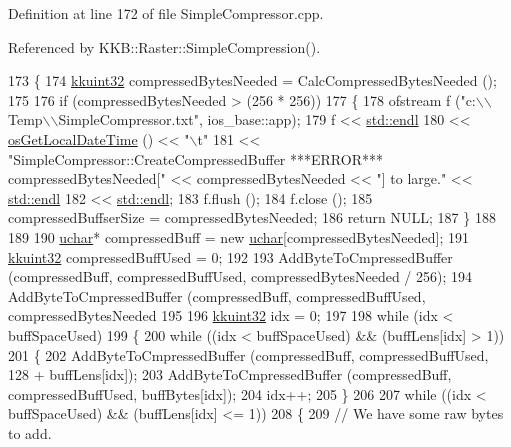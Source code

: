 Definition at line 172 of file Simple\+Compressor.\+cpp.



Referenced by K\+K\+B\+::\+Raster\+::\+Simple\+Compression().


\begin{DoxyCode}
173 \{
174   \hyperlink{namespace_k_k_b_af8d832f05c54994a1cce25bd5743e19a}{kkuint32}  compressedBytesNeeded = CalcCompressedBytesNeeded ();
175 
176   \textcolor{keywordflow}{if}  (compressedBytesNeeded > (256 * 256))
177   \{
178     ofstream  f (\textcolor{stringliteral}{"c:\(\backslash\)\(\backslash\)Temp\(\backslash\)\(\backslash\)SimpleCompressor.txt"}, ios\_base::app);
179     f << \hyperlink{namespace_k_k_b_ad1f50f65af6adc8fa9e6f62d007818a8}{std::endl}
180       << \hyperlink{namespace_k_k_b_af54c205cde0465bcb2c74f3881a96413}{osGetLocalDateTime} () << \textcolor{stringliteral}{"\(\backslash\)t"}
181       << \textcolor{stringliteral}{"SimpleCompressor::CreateCompressedBuffer     ***ERROR***     compressedBytesNeeded["} << 
      compressedBytesNeeded << \textcolor{stringliteral}{"] to large."} << \hyperlink{namespace_k_k_b_ad1f50f65af6adc8fa9e6f62d007818a8}{std::endl}
182       << \hyperlink{namespace_k_k_b_ad1f50f65af6adc8fa9e6f62d007818a8}{std::endl};
183     f.flush ();
184     f.close ();
185     compressedBuffserSize = compressedBytesNeeded;
186     \textcolor{keywordflow}{return} NULL;
187   \}
188 
189 
190   \hyperlink{namespace_k_k_b_ace9969169bf514f9ee6185186949cdf7}{uchar}*  compressedBuff = \textcolor{keyword}{new} \hyperlink{namespace_k_k_b_ace9969169bf514f9ee6185186949cdf7}{uchar}[compressedBytesNeeded];
191   \hyperlink{namespace_k_k_b_af8d832f05c54994a1cce25bd5743e19a}{kkuint32}  compressedBuffUsed = 0;
192 
193   AddByteToCmpressedBuffer (compressedBuff, compressedBuffUsed, compressedBytesNeeded / 256);
194   AddByteToCmpressedBuffer (compressedBuff, compressedBuffUsed, compressedBytesNeeded %
195 
196   \hyperlink{namespace_k_k_b_af8d832f05c54994a1cce25bd5743e19a}{kkuint32}  idx = 0;
197 
198   \textcolor{keywordflow}{while}  (idx < buffSpaceUsed)
199   \{
200     \textcolor{keywordflow}{while}  ((idx < buffSpaceUsed)  &&  (buffLens[idx] > 1))
201     \{
202       AddByteToCmpressedBuffer (compressedBuff, compressedBuffUsed, 128 + buffLens[idx]);
203       AddByteToCmpressedBuffer (compressedBuff, compressedBuffUsed, buffBytes[idx]);
204       idx++;
205     \}
206 
207     \textcolor{keywordflow}{while}  ((idx < buffSpaceUsed)  &&  (buffLens[idx] <= 1))
208     \{
209       \textcolor{comment}{// We have some raw bytes to add.}

\end{DoxyCode}
